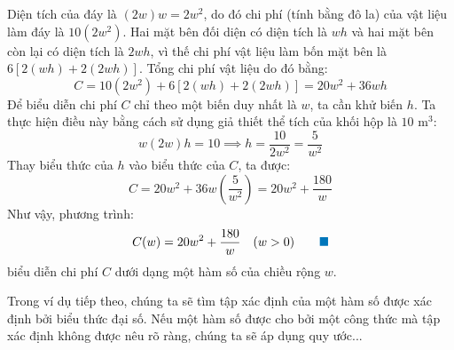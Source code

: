 \documentclass[10pt,letterpaper]{article}
\begin{document}
\begin{minipage}[t]{0.71\textwidth}
    Diện tích của đáy là $(2w)w = 2w^2$, do đó chi phí (tính bằng đô la) của vật liệu làm đáy là $10(2w^2)$. Hai mặt bên đối diện có diện tích là $wh$ và hai mặt bên còn lại có diện tích là $2wh$, vì thế chi phí vật liệu làm bốn mặt bên là $6[2(wh) + 2(2wh)]$. Tổng chi phí vật liệu do đó bằng:
    \[
    C = 10(2w^2) + 6[2(wh) + 2(2wh)] = 20w^2 + 36wh
    \]
    Để biểu diễn chi phí $C$ chỉ theo một biến duy nhất là $w$, ta cần khử biến $h$. Ta thực hiện điều này bằng cách sử dụng giả thiết thể tích của khối hộp là $10\text{ m}^3$:
    \[
    w(2w)h = 10 \implies h = \frac{10}{2w^2} = \frac{5}{w^2}
    \]
    Thay biểu thức của $h$ vào biểu thức của $C$, ta được:
    \[
    C = 20w^2 + 36w\left(\frac{5}{w^2}\right) = 20w^2 + \frac{180}{w}
    \]
    Như vậy, phương trình:
    \begin{equation*}
    C(w) = 20w^2 + \frac{180}{w} \quad (w > 0) \qquad {\color{stewartcyan}\blacksquare}
    \end{equation*}
    biểu diễn chi phí $C$ dưới dạng một hàm số của chiều rộng $w$.

    \vspace{0.25cm}
    Trong ví dụ tiếp theo, chúng ta sẽ tìm tập xác định của một hàm số được xác định bởi biểu thức đại số. Nếu một hàm số được cho bởi một công thức mà tập xác định không được nêu rõ ràng, chúng ta sẽ áp dụng quy ước...
\end{minipage}
\end{document}
